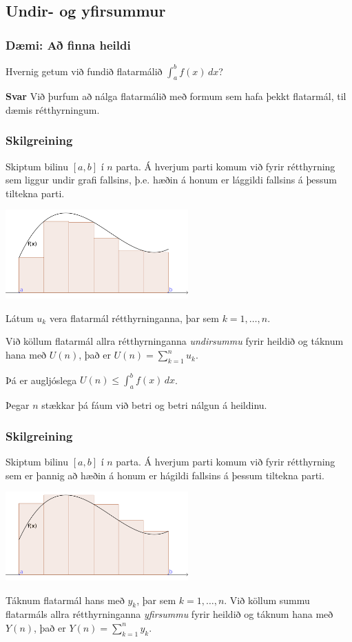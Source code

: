 \documentclass[icelandic,a4paper,12pt]{article}
\begin{document}
\subsection{Undir- og yfirsummur}
\subsubsection{Dæmi: Að finna heildi}
Hvernig getum við fundið flatarmálið $\int_a^b f(x)\, dx$?

\textbf{Svar}
Við þurfum að nálga flatarmálið með formum sem hafa þekkt
flatarmál, 
til dæmis rétthyrningum.

\subsubsection{Skilgreining}
Skiptum bilinu $[a,b]$ í $n$ parta. Á hverjum parti komum við 
fyrir rétthyrning sem liggur undir grafi fallsins, þ.e. hæðin á 
honum er lággildi fallsins á þessum tiltekna parti. 
\begin{center}
  \includegraphics[width=7cm]{./myndir/kafli06/03_undirsumma.png}
\end{center}

Látum $u_k$ vera flatarmál rétthyrninganna, þar sem $k=1,\ldots,n$.

Við köllum flatarmál allra rétthyrninganna \emph{undirsummu} fyrir heildið
og táknum hana með $U(n)$, það er $U(n) = \sum_{k=1}^n u_k$.

Þá er augljóslega $U(n) \leq \int_a^b f(x)\, dx$.

Þegar $n$ stækkar þá fáum við betri og betri nálgun á heildinu.

\subsubsection{Skilgreining}
Skiptum bilinu $[a,b]$ í $n$ parta. Á hverjum parti komum við 
fyrir rétthyrning sem er þannig að  hæðin á 
honum er hágildi fallsins á þessum tiltekna parti. 
\begin{center}
\includegraphics[width=7cm]{./myndir/kafli06/03_yfirsumma.png}
\end{center}
Táknum flatarmál hans með $y_k$, þar sem $k=1,\ldots,n$.
Við köllum summu flatarmáls allra rétthyrninganna \emph{yfirsummu} fyrir heildið
og táknum hana með $Y(n)$, það er $Y(n) = \sum_{k=1}^n y_k$.
\end{document}

